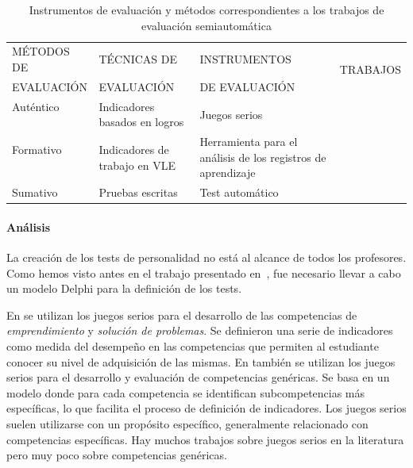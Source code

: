 \begin{table}
  \begin{center}
  \begin{tabular}{| m{2.7cm} | m{2.9cm} | m{4cm} | m{2cm} |}
    \hline 
    MÉTODOS DE  & TÉCNICAS DE  & INSTRUMENTOS  & \multirow{2}{*}{TRABAJOS} \\
    EVALUACIÓN & EVALUACIÓN & DE EVALUACIÓN &  \\
    \hline
    \hline
    Auténtico  & \multirow{2}{3cm}{Indicadores basados en logros} & \multirow{2}{*}{Juegos serios} & \cite{bedek2011behavioral} \\
    \cline{1-1} \cline{4-4}
    \multirow{4}{*}{Formativo} &  &  & \cite{guenaga2013serious} \\
    \cline{2-4}
     & \multirow{3}{2.9cm}{Indicadores de trabajo en VLE} & \multirow{3}{4cm}{Herramienta para el análisis de los registros de aprendizaje} & \multirow{3}{*}{\cite{fidalgo:2015,rayon2014web}} \\
     &  &  &  \\
     &  &  &  \\
    \hline
    Sumativo & Pruebas escritas & Test automático & \cite{andre2011formal} \\
    \hline
  \end{tabular}
\end{center}
\caption{Instrumentos de evaluación y métodos correspondientes a los trabajos de evaluación semiautomática}
\label{tab:MetodosAutomaticos}
\end{table} 


\paragraph*{Análisis}
La creación de los  tests de personalidad no está al alcance de todos los profesores. Como hemos visto antes en el trabajo presentado en~\cite{andre2011formal}, fue necesario llevar a cabo un modelo Delphi para la definición de los tests.

En \cite{guenaga2013serious} se utilizan los juegos serios para el desarrollo de las competencias de \emph{emprendimiento} y \emph{solución de problemas}. Se definieron una serie de indicadores como medida del desempeño en las competencias que permiten al estudiante conocer su nivel de adquisición de las mismas. En \cite{bedek2011behavioral} también se utilizan los juegos serios para el desarrollo y evaluación de competencias genéricas. Se basa en un modelo donde para cada competencia se identifican subcompetencias más específicas, lo que facilita el proceso de definición de indicadores. Los juegos serios suelen utilizarse con un propósito específico, generalmente relacionado con competencias específicas. Hay muchos trabajos sobre juegos serios en la literatura pero muy poco sobre competencias genéricas. 

